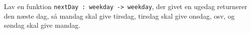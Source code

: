 Lav en funktion \texttt{nextDay : weekday -> weekday}, der givet en
ugedag returnerer den næste dag, så mandag skal give tirsdag, tirsdag
skal give onsdag, osv, og søndag skal give mandag.
